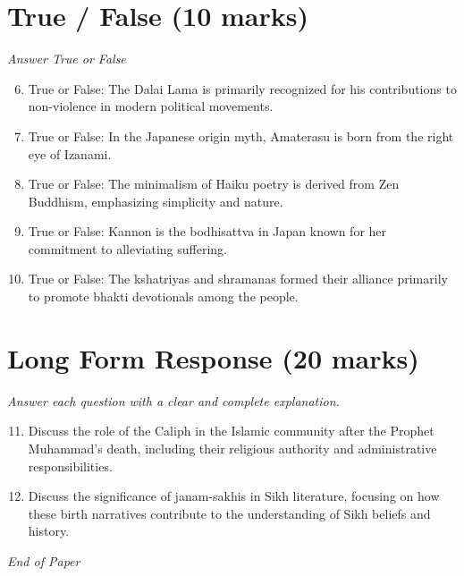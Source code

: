 \documentclass[12pt]{article}
\begin{document}
\section*{True / False (10 marks)}
\textit{Answer True or False}
\begin{enumerate}[label=\arabic*.]
\setcounter{enumi}{5}
\item True or False: The Dalai Lama is primarily recognized for his contributions to non-violence in modern political movements.
\item True or False: In the Japanese origin myth, Amaterasu is born from the right eye of Izanami.
\item True or False: The minimalism of Haiku poetry is derived from Zen Buddhism, emphasizing simplicity and nature.
\item True or False: Kannon is the bodhisattva in Japan known for her commitment to alleviating suffering.
\item True or False: The kshatriyas and shramanas formed their alliance primarily to promote bhakti devotionals among the people.
\end{enumerate}

\section*{Long Form Response (20 marks)}
\textit{Answer each question with a clear and complete explanation.}
\begin{enumerate}[label=\arabic*.]
\setcounter{enumi}{10}
\item Discuss the role of the Caliph in the Islamic community after the Prophet Muhammad's death, including their religious authority and administrative responsibilities.
\item Discuss the significance of janam-sakhis in Sikh literature, focusing on how these birth narratives contribute to the understanding of Sikh beliefs and history.
\end{enumerate}

\vfill
\noindent\textit{End of Paper}
\end{document}
